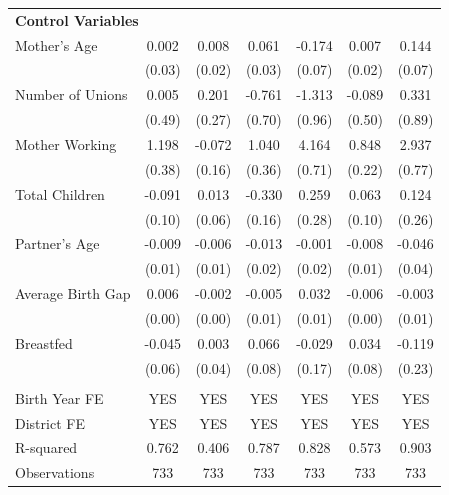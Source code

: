 \begin{longtable}{l*{6}{c}}
\multicolumn{7}{l}{\textbf{Control Variables}} \\
Mother's Age       & 0.002 & 0.008 & 0.061\sym{*} & -0.174\sym{**} & 0.007 & 0.144\sym{**} \\
                    & (0.03) & (0.02) & (0.03) & (0.07) & (0.02) & (0.07) \\
Number of Unions   & 0.005 & 0.201 & -0.761 & -1.313 & -0.089 & 0.331 \\
                    & (0.49) & (0.27) & (0.70) & (0.96) & (0.50) & (0.89) \\
Mother Working     & 1.198\sym{***} & -0.072 & 1.040\sym{***} & 4.164\sym{***} & 0.848\sym{***} & 2.937\sym{***} \\
                    & (0.38) & (0.16) & (0.36) & (0.71) & (0.22) & (0.77) \\
Total Children     & -0.091 & 0.013 & -0.330\sym{**} & 0.259 & 0.063 & 0.124 \\
                    & (0.10) & (0.06) & (0.16) & (0.28) & (0.10) & (0.26) \\
Partner's Age      & -0.009 & -0.006 & -0.013 & -0.001 & -0.008 & -0.046 \\
                    & (0.01) & (0.01) & (0.02) & (0.02) & (0.01) & (0.04) \\
Average Birth Gap  & 0.006 & -0.002 & -0.005 & 0.032\sym{**} & -0.006 & -0.003 \\
                    & (0.00) & (0.00) & (0.01) & (0.01) & (0.00) & (0.01) \\
Breastfed         & -0.045 & 0.003 & 0.066 & -0.029 & 0.034 & -0.119 \\
                    & (0.06) & (0.04) & (0.08) & (0.17) & (0.08) & (0.23) \\
\\
Birth Year FE      & YES & YES & YES & YES & YES & YES \\
District FE        & YES & YES & YES & YES & YES & YES \\
R-squared         & 0.762 & 0.406 & 0.787 & 0.828 & 0.573 & 0.903 \\
Observations      & 733 & 733 & 733 & 733 & 733 & 733 \\
\end{longtable}